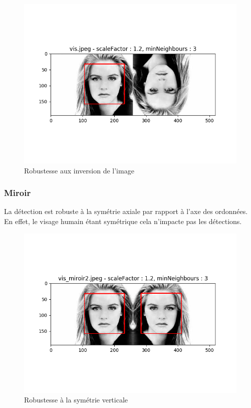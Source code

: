 \documentclass[a4paper,11pt]{article}
\begin{document}
	    \begin{figure}[H]
	        \begin{center}
		   \includegraphics[scale = 0.6]{images/vis_1,2_3.png}
		   \caption{Robustesse aux inversion de l'image}
		   \label{fig:vis_inv}
	        \end{center}
	    \end{figure}

	\subsubsection{Miroir}

	    La détection est robuste à la symétrie axiale par rapport à l'axe des ordonnées. En effet,
	    le visage humain étant symétrique cela n'impacte pas les détections.

	    \begin{figure}[H]
	        \begin{center}
	           \includegraphics[scale = 0.6]{images/vis_miroir2_1,2_3.png}
		    \caption{Robustesse à la symétrie verticale}
	           \label{fig:miroir}
	        \end{center}
	    \end{figure}
\end{document}
